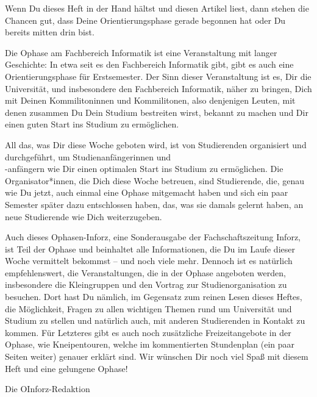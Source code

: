 {Wenn Du dieses Heft in der Hand hältst und diesen Artikel liest, dann stehen die Chancen gut, dass Deine Orientierungsphase gerade begonnen hat oder Du bereits mitten drin bist.}
{
    Die Ophase am Fachbereich Informatik ist eine Veranstaltung mit langer Geschichte: In etwa seit es den Fachbereich Informatik gibt, gibt es auch eine Orientierungsphase für Erstsemester. Der Sinn dieser Veranstaltung ist es, Dir die Universität, und insbesondere den Fachbereich Informatik, näher zu bringen, Dich mit Deinen Kommilitoninnen und Kommilitonen, also denjenigen Leuten, mit denen zusammen Du Dein Studium bestreiten wirst, bekannt zu machen und Dir einen guten Start ins Studium zu ermöglichen.

    All das, was Dir diese Woche geboten wird, ist von Studierenden organisiert und durchgeführt, um Studienanfängerinnen und \\ -anfängern wie Dir einen optimalen Start ins Studium zu ermöglichen. Die Organisator*innen, die Dich diese Woche betreuen, sind Studierende, die, genau wie Du jetzt, auch einmal eine Ophase mitgemacht haben und sich ein paar Semester später dazu entschlossen haben, das, was sie damals gelernt haben, an neue Studierende wie Dich weiterzugeben.

    Auch dieses Ophasen-Inforz, eine Sonderausgabe der Fachschaftszeitung Inforz, ist Teil der Ophase und beinhaltet alle Informationen, die Du im Laufe dieser Woche vermittelt bekommst – und noch viele mehr. Dennoch ist es natürlich empfehlenswert, die Veranstaltungen, die in der Ophase angeboten werden, insbesondere die Kleingruppen und den Vortrag zur Studienorganisation zu besuchen. Dort hast Du nämlich, im Gegensatz zum reinen Lesen dieses Heftes, die Möglichkeit, Fragen zu allen wichtigen Themen rund um Universität und Studium zu stellen und natürlich auch, mit anderen Studierenden in Kontakt zu kommen. Für Letzteres gibt es auch noch zusätzliche Freizeitangebote in der Ophase, wie Kneipentouren, welche im kommentierten Stundenplan (ein paar Seiten weiter) genauer erklärt sind.
    Wir wünschen Dir noch viel Spaß mit diesem Heft und eine gelungene Ophase!
}
{Die OInforz-Redaktion}

